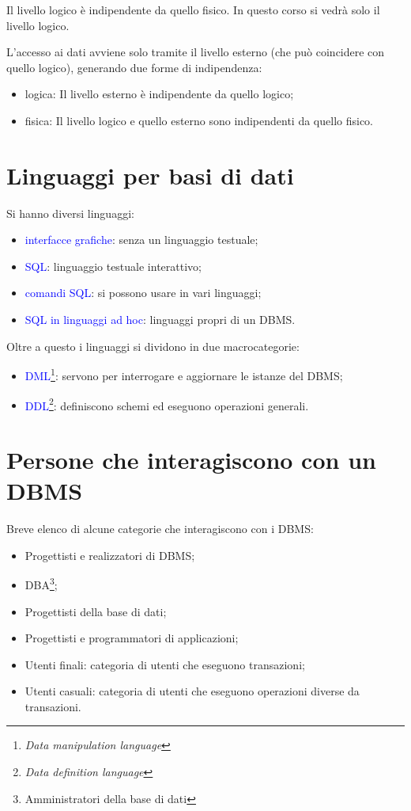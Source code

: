 Il livello logico è indipendente da quello fisico. In questo corso si vedrà solo il livello logico.

L'accesso ai dati avviene solo tramite il livello esterno (che può coincidere con quello logico), generando due forme di indipendenza:
\begin{itemize}
    \item logica: Il livello esterno è indipendente da quello logico;
    \item fisica: Il livello logico e quello esterno sono indipendenti da quello fisico. 
\end{itemize}

\section{Linguaggi per basi di dati}

Si hanno diversi linguaggi:
\begin{itemize}
    \item \textcolor{blue}{interfacce grafiche}: senza un linguaggio testuale;
    \item \textcolor{blue}{SQL}: linguaggio testuale interattivo;
    \item \textcolor{blue}{comandi SQL}: si possono usare in vari linguaggi;
    \item \textcolor{blue}{SQL in linguaggi ad hoc}: linguaggi propri di un DBMS.
\end{itemize}

Oltre a questo i linguaggi si dividono in due macrocategorie: 
\begin{itemize}
    \item \textcolor{blue}{DML}\footnote{\textit{Data manipulation language}}: servono per interrogare e aggiornare le istanze del DBMS;
    \item \textcolor{blue}{DDL}\footnote{\textit{Data definition language}}: definiscono schemi ed eseguono operazioni generali. 
\end{itemize}

\section{Persone che interagiscono con un DBMS}

Breve elenco di alcune categorie che interagiscono con i DBMS:

\begin{itemize}
    \item Progettisti e realizzatori di DBMS;
    \item DBA\footnote{Amministratori della base di dati};
    \item Progettisti della base di dati;
    \item Progettisti e programmatori di applicazioni;
    \item Utenti finali: categoria di utenti che eseguono transazioni;
    \item Utenti casuali: categoria di utenti che eseguono operazioni diverse da transazioni.
\end{itemize}